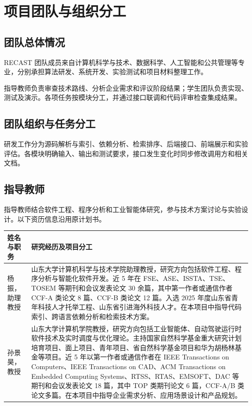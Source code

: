 \chapter{项目团队与组织分工}
\label{chap:team}

\section{团队总体情况}

RECAST 团队成员来自计算机科学与技术、数据科学、人工智能和公共管理等专业，分别承担算法研发、系统开发、实验测试和项目材料整理工作。

指导教师负责审查技术路线、分析企业需求和评议阶段结果；学生团队负责实现、测试及演示。各项任务按模块分工，并通过接口联调和代码评审检查集成结果。

\section{团队组织与任务分工}

研发工作分为源码解析与索引、依赖分析、检索排序、后端接口、前端展示和实验评估。各模块明确输入、输出和测试要求，接口发生变化时同步修改调用方和相关文档。

\section{指导教师}

指导教师结合软件工程、程序分析和工业智能体研究，参与技术方案讨论与实验设计。以下资历信息沿用原计划书。

\begin{center}\small
\begin{longtable}{P{0.19\textwidth}P{0.71\textwidth}}
\toprule
姓名与职务 & 研究经历及项目分工 \\
\midrule\endhead
杨振，助理教授 & 山东大学计算机科学与技术学院助理教授，研究方向包括软件工程、程序分析与智能化软件开发。近 5 年在 FSE、ASE、ISSTA、TSE、TOSEM 等期刊和会议发表论文 30 余篇，其中第一作者或通信作者 CCF-A 类论文 8 篇、CCF-B 类论文 12 篇。入选 2025 年度山东省青年科技人才托举工程、山东省引进海外科技人才。在本项目中指导代码索引、跨语言依赖分析和检索技术方案。 \\
孙景昊，教授 & 山东大学计算机学院教授，研究方向包括工业智能体、自动驾驶运行时软件技术及实时调度与优化理论。主持国家自然科学基金重大研究计划培育项目、面上项目、青年项目、省自然科学基金项目和华为胡杨林基金等项目。近 5 年以第一作者或通信作者在 IEEE Transactions on Computers、IEEE Transactions on CAD、ACM Transactions on Embedded Computing Systems、RTSS、RTAS、EMSOFT、DAC 等期刊和会议发表论文 18 篇，其中 TOP 类期刊论文 6 篇，CCF-A/B 类论文多篇。在本项目中指导企业需求分析、应用场景设计和产品规划。 \\
\bottomrule
\end{longtable}\end{center}

